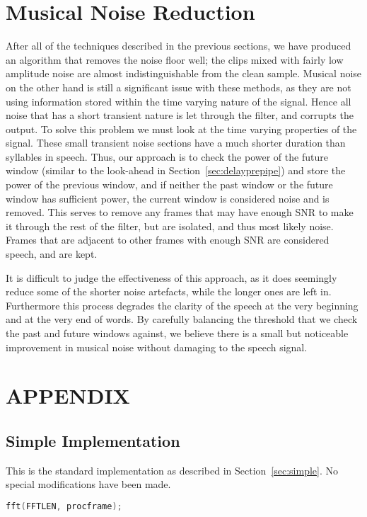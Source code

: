 \documentclass[11pt]{article} %
\begin{document}
{\section{Musical Noise Reduction} 
After all of the techniques described in the previous sections, we have produced an algorithm that removes the noise floor well; the clips mixed with fairly low amplitude noise are almost indistinguishable from the clean sample. Musical noise on the other hand is still a significant issue with these methods, as they are not using information stored within the time varying nature of the signal. Hence all noise that has a short transient nature is let through the filter, and corrupts the output.
To solve this problem we must look at the time varying properties of the signal. These small transient noise sections have a much shorter duration than syllables in speech. Thus, our approach is to check the power of the future window (similar to the look-ahead in Section~\ref{sec:delayprepipe}) and store the power of the previous window, and if neither the past window or the future window has sufficient power, the current window is considered noise and is removed. This serves to remove any frames that may have enough SNR to make it through the rest of the filter, but are isolated, and thus most likely noise. Frames that are adjacent to other frames with enough SNR are considered speech, and are kept. 

It is difficult to judge the effectiveness of this approach, as it does seemingly reduce some of the shorter noise artefacts, while the longer ones are left in. 
Furthermore this process degrades the clarity of the speech at the very beginning and at the very end of words. By carefully balancing the threshold that we check the past and future windows against, we believe there is a small but noticeable improvement in musical noise without damaging to the speech signal. 

\clearpage

\section{APPENDIX}
\renewcommand{\thesubsection}{\Alph{subsection}}
\subsection{Simple Implementation} 
\label{app:simple}

This is the standard implementation as described in Section~\ref{sec:simple}. No special modifications have been made. 
  \begin{center}
    \begin{lstlisting}[language = C]
fft(FFTLEN, procframe);
									

\end{lstlisting}
\end{center}}
\end{document}
